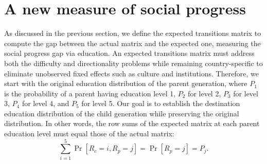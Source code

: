 \section{A new measure of social progress} \label{sec:new}

As discussed in the previous section, we define the expected transitions matrix to compute the gap between the actual matrix and the expected one, measuring the social progress gap via education. An expected transitions matrix must address both the difficulty and directionality problems while remaining country-specific to eliminate unobserved fixed effects such as culture and institutions. Therefore, we start with the original education distribution of the parent generation, where \( P_1 \) is the probability of a parent having education level 1, \( P_2 \) for level 2, \( P_3 \) for level 3, \( P_4 \) for level 4, and \( P_5 \) for level 5. Our goal is to establish the destination education distribution of the child generation while preserving the original distribution. In other words, the row sums of the expected matrix at each parent education level must equal those of the actual matrix:  
\begin{equation}
\sum_{i=1}^{5} \operatorname{Pr}[R_c = i, R_p = j] = \operatorname{Pr}[R_p = j] = P_j.
\label{eq:1}
\end{equation}

